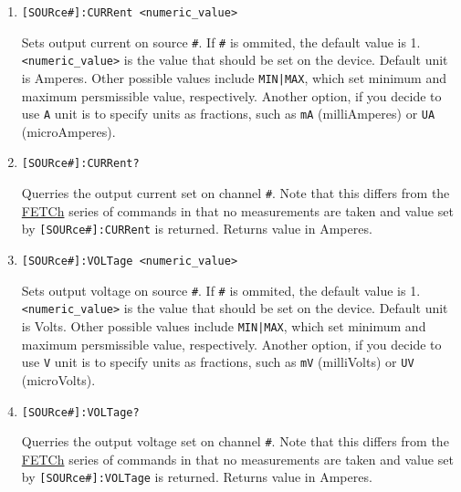 \documentclass[a4paper,10pt]{article}
\begin{document}
\begin{enumerate}
\begin{enumerate}
		\item
		    \begin{verbatim}[SOURce#]:CURRent <numeric_value>\end{verbatim}
		    \begin{description}
		        Sets output current on source \verb|#|. If \verb|#| is ommited, the default value is 1.
		        \newline
		        \verb|<numeric_value>| is the value that should be set on the device. Default unit is Amperes. Other possible values include \verb!MIN|MAX!, which set minimum and maximum persmissible value, respectively. Another option, if you decide to use \verb|A| unit is to specify units as fractions, such as \verb|mA| (milliAmperes) or \verb|UA| (microAmperes). 
		    \end{description}
		\item 
		    \begin{verbatim}[SOURce#]:CURRent?\end{verbatim}
		    \begin{description}
		        Querries the output current set on channel \verb|#|. Note that this differs from the \hyperlink{FETCh}{FETCh} series of commands in that no measurements are taken and value set by \verb|[SOURce#]:CURRent| is returned.
		        \newline
		        Returns value in Amperes.
		    \end{description}
		\item 
		    \begin{verbatim}[SOURce#]:VOLTage <numeric_value>\end{verbatim}
		    \begin{description}
		        Sets output voltage on source \verb|#|. If \verb|#| is ommited, the default value is 1.
		        \newline
		        \verb|<numeric_value>| is the value that should be set on the device. Default unit is Volts. Other possible values include \verb!MIN|MAX!, which set minimum and maximum persmissible value, respectively. Another option, if you decide to use \verb|V| unit is to specify units as fractions, such as \verb|mV| (milliVolts) or \verb|UV| (microVolts). 
		    \end{description}
		\item 
		    \begin{verbatim}[SOURce#]:VOLTage?\end{verbatim}
		    \begin{description}
		        Querries the output voltage set on channel \verb|#|. Note that this differs from the \hyperlink{FETCh}{FETCh} series of commands in that no measurements are taken and value set by \verb|[SOURce#]:VOLTage| is returned.
		        \newline
		        Returns value in Amperes.
		    \end{description}


\end{enumerate}
\end{enumerate}
\end{document}
